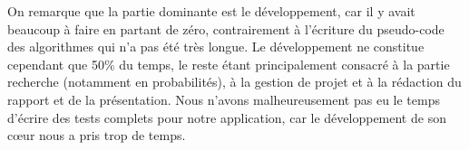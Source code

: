 On remarque que la partie dominante est le développement, car il y avait beaucoup à faire en partant de zéro, contrairement à l'écriture du pseudo-code des algorithmes qui n'a pas été très longue. Le développement ne constitue cependant que 50\% du temps, le reste étant principalement consacré à la partie recherche (notamment en probabilités), à la gestion de projet et à la rédaction du rapport et de la présentation.
Nous n'avons malheureusement pas eu le temps d'écrire des tests complets pour notre application, car le développement de son cœur nous a pris trop de temps.


